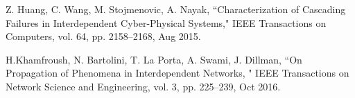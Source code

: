 \documentclass[letterpaper, 10 pt, conference]{ieeeconf}  %
\begin{document}









\begin{thebibliography}{99}

 Z. Huang, C. Wang, M. Stojmenovic, A. Nayak, ``Characterization of Cascading Failures in Interdependent Cyber-Physical Systems," IEEE Transactions on Computers, vol. 64, pp. 2158--2168, Aug 2015.

 H.Khamfroush, N. Bartolini, T. La Porta, A. Swami, J. Dillman, ``On Propagation of Phenomena
in Interdependent Networks, " IEEE Transactions on Network Science and Engineering, vol. 3, pp. 225--239, Oct 2016.


\end{thebibliography}
\end{document}
